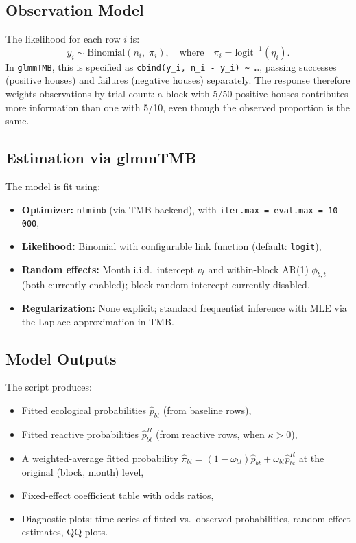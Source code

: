\documentclass[12pt,a4paper]{article}
\begin{document}
\subsection{Observation Model}

The likelihood for each row $i$ is:
\begin{equation}
y_i \sim \text{Binomial}(n_i,\; \pi_i), \quad \text{where} \quad \pi_i = \text{logit}^{-1}(\eta_i).
\end{equation}
In \texttt{glmmTMB}, this is specified as \texttt{cbind(y\_i, n\_i - y\_i) \textasciitilde{} \ldots}, passing successes (positive houses) and failures (negative houses) separately.
The response therefore weights observations by trial count: a block with 5/50 positive houses contributes more information than one with 5/10, even though the observed proportion is the same.

\subsection{Estimation via glmmTMB}

The model is fit using:
\begin{itemize}
\item \textbf{Optimizer:} \texttt{nlminb} (via TMB backend), with \texttt{iter.max = eval.max = 10\,000},
\item \textbf{Likelihood:} Binomial with configurable link function (default: \texttt{logit}),
\item \textbf{Random effects:} Month i.i.d.\ intercept $v_t$ and within-block AR(1) $\phi_{b,t}$ (both currently enabled); block random intercept currently disabled,
\item \textbf{Regularization:} None explicit; standard frequentist inference with MLE via the Laplace approximation in TMB.
\end{itemize}

\subsection{Model Outputs}

The script produces:
\begin{itemize}
\item Fitted ecological probabilities $\hat{p}_{bt}$ (from baseline rows),
\item Fitted reactive probabilities $\hat{p}_{bt}^R$ (from reactive rows, when $\kappa > 0$),
\item A weighted-average fitted probability $\hat{\pi}_{bt} = (1 - \omega_{bt})\hat{p}_{bt} + \omega_{bt}\hat{p}_{bt}^R$ at the original (block, month) level,
\item Fixed-effect coefficient table with odds ratios,
\item Diagnostic plots: time-series of fitted vs.\ observed probabilities, random effect estimates, QQ plots.
\end{itemize}
\end{document}

